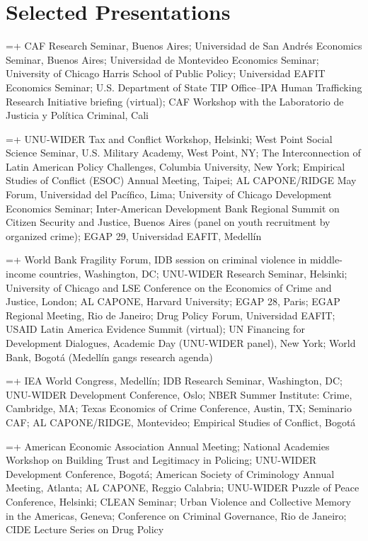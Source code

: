 \documentclass[10pt]{article}
\newlength{\datecolwidth}
\newlength{\gapwidth}
\newcommand{\cventry}[2]{%
  \par\hangindent=\dimexpr\datecolwidth+\gapwidth\relax\hangafter=1
  \noindent\makebox[\datecolwidth][l]{#1}\hspace{\gapwidth}#2\par\vspace{0.1ex}}
\begin{document}
\section*{Selected Presentations}

\cventry{2026}{CAF Research Seminar, Buenos Aires; Universidad de San Andr\'{e}s Economics Seminar, Buenos Aires; Universidad de Montevideo Economics Seminar; University of Chicago Harris School of Public Policy; Universidad EAFIT Economics Seminar; U.S. Department of State TIP Office--IPA Human Trafficking Research Initiative briefing (virtual); CAF Workshop with the Laboratorio de Justicia y Pol\'{i}tica Criminal, Cali}
\cventry{2025}{UNU-WIDER Tax and Conflict Workshop, Helsinki; West Point Social Science Seminar, U.S. Military Academy, West Point, NY; The Interconnection of Latin American Policy Challenges, Columbia University, New York; Empirical Studies of Conflict (ESOC) Annual Meeting, Taipei; AL CAPONE/RIDGE May Forum, Universidad del Pac\'{i}fico, Lima; University of Chicago Development Economics Seminar; Inter-American Development Bank Regional Summit on Citizen Security and Justice, Buenos Aires (panel on youth recruitment by organized crime); EGAP 29, Universidad EAFIT, Medell\'{i}n} %
\cventry{2024}{World Bank Fragility Forum, IDB session on criminal violence in middle-income countries, Washington, DC; UNU-WIDER Research Seminar, Helsinki; University of Chicago and LSE Conference on the Economics of Crime and Justice, London; AL CAPONE, Harvard University; EGAP 28, Paris; EGAP Regional Meeting, Rio de Janeiro; Drug Policy Forum, Universidad EAFIT; USAID Latin America Evidence Summit (virtual); UN Financing for Development Dialogues, Academic Day (UNU-WIDER panel), New York; World Bank, Bogot\'{a} (Medell\'{i}n gangs research agenda)} %
\cventry{2023}{IEA World Congress, Medell\'{i}n; IDB Research Seminar, Washington, DC; UNU-WIDER Development Conference, Oslo; NBER Summer Institute: Crime, Cambridge, MA; Texas Economics of Crime Conference, Austin, TX; Seminario CAF; AL CAPONE/RIDGE, Montevideo; Empirical Studies of Conflict, Bogot\'{a}}
\cventry{2022}{American Economic Association Annual Meeting; National Academies Workshop on Building Trust and Legitimacy in Policing; UNU-WIDER Development Conference, Bogot\'{a}; American Society of Criminology Annual Meeting, Atlanta; AL CAPONE, Reggio Calabria; UNU-WIDER Puzzle of Peace Conference, Helsinki; CLEAN Seminar; Urban Violence and Collective Memory in the Americas, Geneva; Conference on Criminal Governance, Rio de Janeiro; CIDE Lecture Series on Drug Policy}
\end{document}
